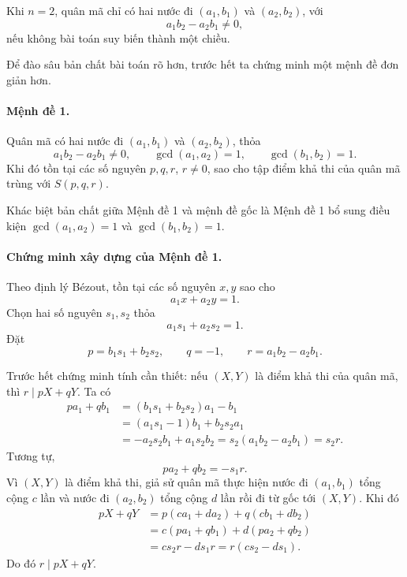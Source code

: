 \documentclass[11pt]{article}
\begin{document}
Khi \(n=2\), quân mã chỉ có hai nước đi \((a_1,b_1)\) và \((a_2,b_2)\), với
\[
  a_1b_2-a_2b_1\ne 0,
\]
nếu không bài toán suy biến thành một chiều.

Để đào sâu bản chất bài toán rõ hơn, trước hết ta chứng minh một mệnh đề đơn
giản hơn.

\paragraph{Mệnh đề 1.}
Quân mã có hai nước đi \((a_1,b_1)\) và \((a_2,b_2)\), thỏa
\[
  a_1b_2-a_2b_1\ne 0,\qquad \gcd(a_1,a_2)=1,\qquad \gcd(b_1,b_2)=1.
\]
Khi đó tồn tại các số nguyên \(p,q,r\), \(r\ne 0\), sao cho tập điểm khả thi
của quân mã trùng với \(S(p,q,r)\).

Khác biệt bản chất giữa Mệnh đề 1 và mệnh đề gốc là Mệnh đề 1 bổ sung điều
kiện \(\gcd(a_1,a_2)=1\) và \(\gcd(b_1,b_2)=1\).

\paragraph{Chứng minh xây dựng của Mệnh đề 1.}
Theo định lý Bézout, tồn tại các số nguyên \(x,y\) sao cho
\[
  a_1x+a_2y=1.
\]
Chọn hai số nguyên \(s_1,s_2\) thỏa
\[
  a_1s_1+a_2s_2=1.
\]
Đặt
\[
  p=b_1s_1+b_2s_2,\qquad q=-1,\qquad r=a_1b_2-a_2b_1.
\]

Trước hết chứng minh tính cần thiết: nếu \((X,Y)\) là điểm khả thi của quân
mã, thì \(r\mid pX+qY\). Ta có
\[
\begin{aligned}
  pa_1+qb_1
  &= (b_1s_1+b_2s_2)a_1-b_1 \\
  &= (a_1s_1-1)b_1+b_2s_2a_1 \\
  &= -a_2s_2b_1+a_1s_2b_2
   = s_2(a_1b_2-a_2b_1)=s_2r.
\end{aligned}
\]
Tương tự,
\[
  pa_2+qb_2=-s_1r.
\]
Vì \((X,Y)\) là điểm khả thi, giả sử quân mã thực hiện nước đi
\((a_1,b_1)\) tổng cộng \(c\) lần và nước đi \((a_2,b_2)\) tổng cộng \(d\) lần
rồi đi từ gốc tới \((X,Y)\). Khi đó
\[
\begin{aligned}
  pX+qY
  &=p(ca_1+da_2)+q(cb_1+db_2)\\
  &=c(pa_1+qb_1)+d(pa_2+qb_2)\\
  &=cs_2r-ds_1r
   =r(cs_2-ds_1).
\end{aligned}
\]
Do đó \(r\mid pX+qY\).
\end{document}
